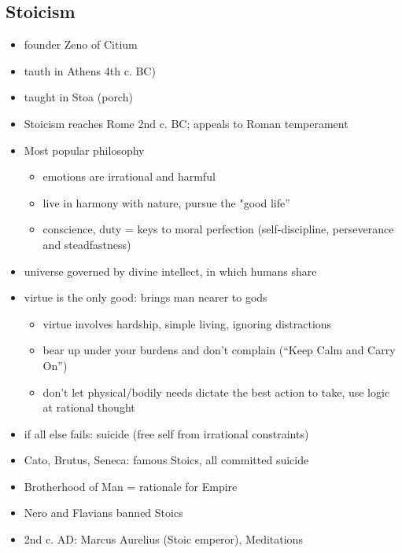 \documentclass[12pt, twoside]{article}
\begin{document}
\subsection{Stoicism}
\begin{itemize}
\item founder Zeno of Citium
\item tauth in Athens 4th c. BC)
\item taught in Stoa (porch)
\item Stoicism reaches Rome 2nd c. BC; appeals to Roman temperament
\item Most popular philosophy
	\begin{itemize}
	\item emotions are irrational and harmful
	\item live in harmony with nature, pursue the "good life”
	\item conscience, duty = keys to moral perfection (self-discipline, perseverance and steadfastness)
	\end{itemize}
\item universe governed by divine intellect, in which humans share
\item virtue is the only good: brings man nearer to gods
	\begin{itemize}
	\item virtue involves hardship, simple living, ignoring distractions
	\item bear up under your burdens and don’t complain (“Keep Calm and Carry On”)
	\item don’t let physical/bodily needs dictate the best action to take, use logic at rational thought
	\end{itemize}
\item if all else fails: suicide (free self from irrational constraints)
\item Cato, Brutus, Seneca: famous Stoics, all committed suicide
\item Brotherhood of Man = rationale for Empire
\item Nero and Flavians banned Stoics
\item 2nd c. AD: Marcus Aurelius (Stoic emperor), Meditations
\end{itemize}
\end{document}
